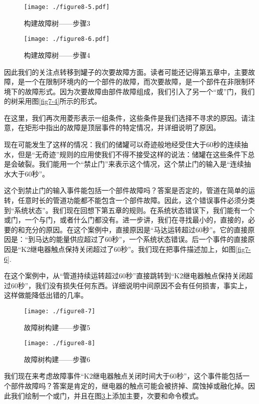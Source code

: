 \documentclass[cn,11pt,chinese]{elegantbook}
\begin{document}
{\begin{figure}[H]
	\centering
	\texttt{[image: ./figure8-5.pdf]}
	\caption{构建故障树——步骤3}
	\label{fig8-5}
\end{figure}

\begin{figure}[H]
	\centering
	\texttt{[image: ./figure8-6.pdf]}
	\caption{构建故障树——步骤4}
	\label{fig8-6}
\end{figure}

因此我们的关注点转移到罐子的次要故障方面。读者可能还记得第五章中，主要故障，是一个在限制环境内的一个部件的故障，而次要故障，是一个部件在非限制环境下的故障形式。因为次要故障由部件故障组成，我们引入了另一个“或”门，我们的树采用图\ref{fig7-4}所示的形式。

在这里，我们再次用菱形表示一组条件，这些条件是我们选择不寻求的原因。请注意，在矩形中指出的故障是顶层事件的特定情况，并详细说明了原因。

现在可能发生了这样的情况：我们的储罐可以奇迹般地经受住大于60秒的连续抽水，但是“无奇迹”规则的应用使我们不得不接受这样的说法：储罐在这些条件下总是会破裂。我们能用一个“禁止门”来表示这个情况，这个禁止门的输入是“连续抽水大于60秒”。

这个到禁止门的输入事件能包括一个部件故障吗？答案是否定的，管道在简单的运转，任意时长的管道功能都不能包含一个部件故障。因此，这个错误事件必须分类到“系统状态”。我们现在回想下第五章的规则。在系统状态错误下，我们能有一个或门，一个与门，或者什么门都没有。进一步讲，我们在寻找最小的，直接的，必要的和充分的原因。在这个案例中，直接原因是“马达运转超过60秒”。它的直接原因是：“到马达的能量供应超过了60秒”，一个系统状态错误。后一个事件的直接原因是“K2继电器触点保持关闭超过了60秒”。我们现在把事件描述加上，如图\ref{fig7-6}.

在这个案例中，从“管道持续运转超过60秒”直接跳转到“K2继电器触点保持关闭超过60秒”，我们没有损失任何东西。详细说明中间原因不会有任何损害，事实上，这样做能降低出错的几率。

\begin{figure}[H]
	\centering
	\texttt{[image: ./figure8-7]}
	\caption{故障树构建——步骤5}
	\label{fig8-7}
\end{figure}

\begin{figure}[H]
	\centering
	\texttt{[image: ./figure8-8]}
	\caption{故障树构建——步骤6}
	\label{fig8-8}
\end{figure}

我们现在来考虑故障事件“K2继电器触点关闭时间大于60秒”，这个事件能包括一个部件故障吗？答案是肯定的，继电器的触点可能会被挤掉、腐蚀掉或融化掉。因此我们绘制一个或门，并且在图\ref{fig8-7}上添加主要，次要和命令模式。

}
\end{document}
